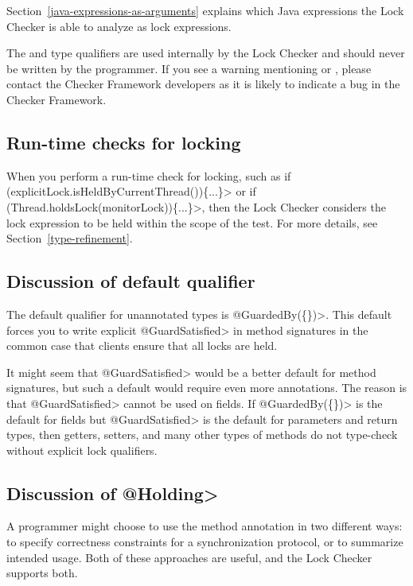 Section~\ref{java-expressions-as-arguments} explains which Java
expressions the Lock Checker is able to analyze as lock expressions.


The  and  type qualifiers are used internally by the Lock Checker
and should never be written by the programmer.
If you
see a warning mentioning  or ,
please contact the Checker Framework developers as it is likely to
indicate a bug in the Checker Framework.


\subsection{Run-time checks for locking\label{lock-runtime-checks}}

When you perform a run-time check for locking, such as
\<if (explicitLock.isHeldByCurrentThread())\{...\}> or
\<if (Thread.holdsLock(monitorLock))\{...\}>,
then the Lock Checker considers the lock expression to be held
within the scope of the test.  For more details, see
Section~\ref{type-refinement}.


\subsection{Discussion of default qualifier\label{lock-checker-default-qualifier}}

The default qualifier for unannotated types is \<@GuardedBy(\{\})>.
This default forces you to write explicit \<@GuardSatisfied> in method
signatures in the common case that clients ensure that all locks are held.

It might seem that \<@GuardSatisfied> would be a better default for
method signatures, but such a default would require even more annotations.
The reason is that \<@GuardSatisfied> cannot be used on fields.  If
\<@GuardedBy(\{\})> is the default for fields but \<@GuardSatisfied> is the
default for parameters and return types, then getters, setters, and many
other types of methods do not type-check without explicit lock qualifiers.


\subsection{Discussion of \<@Holding>\label{lock-checker-holding}}

A programmer might choose to use the  method annotation in
two different ways:  to specify correctness constraints for a
synchronization protocol, or to summarize intended usage.  Both of these
approaches are useful, and the Lock Checker supports both.

